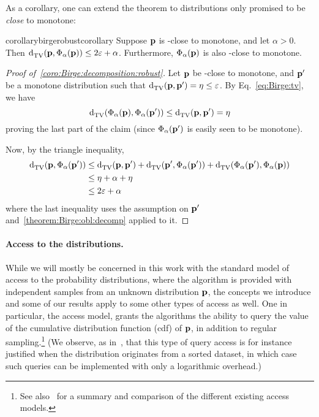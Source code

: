 \noindent As a corollary, one can extend the theorem to distributions only promised to be \emph{close} to monotone:
\begin{restatable}{corollary}{birgerobustcorollary}\label{coro:Birge:decomposition:robust}
    Suppose $\D$ is \eps-close to monotone, and let $\alpha > 0$. Then $\totalvardist{\D}{ \birge[\D]{\alpha} } \leq 2\eps + \alpha$. Furthermore,  $\birge[\D]{\alpha}$ is also \eps-close to monotone.
\end{restatable}
\begin{proof}[Proof of~\cref{coro:Birge:decomposition:robust}]
  Let $\D$ be \eps-close to monotone, and $\D^\prime$ be a monotone distribution such that $\totalvardist{\D}{\D^\prime} = \eta \leq \eps$. By Eq.~\eqref{eq:Birge:tv}, we have
  \begin{equation}\label{eqn:phialpha:cannot:increase:tv}
      \totalvardist{ \birge[\D]{\alpha} }{ \birge[\D^\prime]{\alpha} } \leq \totalvardist{\D}{\D^\prime} = \eta
  \end{equation}
  proving the last part of the claim  (since $\birge[\D^\prime]{\alpha}$ is easily seen to be monotone).

  \noindent Now, by the triangle inequality,
  \begin{align*}
      \totalvardist{\D}{ \birge[\D^\prime]{\alpha} } &\leq \totalvardist{\D}{\D^\prime} + \totalvardist{\D^\prime}{ \birge[\D^\prime]{\alpha} } + \totalvardist{ \birge[\D^\prime]{\alpha} }{ \birge[\D]{\alpha} } \\
      &\leq \eta + \alpha + \eta \\
      &\leq 2\eps+\alpha
  \end{align*}
  where the last inequality uses the assumption on $\D^\prime$ and~\cref{theorem:Birge:obl:decomp} applied to it.
\end{proof}
  
\paragraph{Access to the distributions.} While we will mostly be concerned in this work with the standard model of access to the probability distributions, where the algorithm is provided with independent samples from an unknown distribution $\D$, the concepts we introduce and some of our results apply to some other types of access as well. One in particular, the \Cdfsamp access model, grants the algorithms the ability to query the value of the cumulative distribution function (cdf) of $\D$, in addition to regular sampling.\footnote{See also~\cite{clement:survey:distributions} for a summary and comparison of the different existing access models.} (We observe, as in~\cite{CR:14}, that this type of query access is for instance justified when the distribution originates from a sorted dataset, in which case such queries can be implemented with only a logarithmic overhead.)

